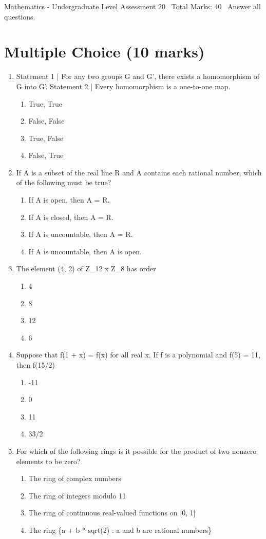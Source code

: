 \documentclass[12pt]{article}
\begin{document}
\begin{center}
Mathematics - Undergraduate Level Assessment 20 \
Total Marks: 40 \
Answer all questions.
\end{center}

\section*{Multiple Choice (10 marks)}
\begin{enumerate}[label=\arabic*.]
\item Statement 1 | For any two groups G and G', there exists a homomorphism of G into G'. Statement 2 | Every homomorphism is a one-to-one map.
\begin{enumerate}[label=(\alph*)]
    \item True, True
    \item False, False
    \item True, False
    \item False, True
\end{enumerate}
\item If A is a subset of the real line R and A contains each rational number, which of the following must be true?
\begin{enumerate}[label=(\alph*)]
    \item If A is open, then A = R.
    \item If A is closed, then A = R.
    \item If A is uncountable, then A = R.
    \item If A is uncountable, then A is open.
\end{enumerate}
\item The element (4, 2) of Z\_12 x Z\_8 has order
\begin{enumerate}[label=(\alph*)]
    \item 4
    \item 8
    \item 12
    \item 6
\end{enumerate}
\item Suppose that f(1 + x) = f(x) for all real x. If f is a polynomial and f(5) = 11, then f(15/2)
\begin{enumerate}[label=(\alph*)]
    \item -11
    \item 0
    \item 11
    \item 33/2
\end{enumerate}
\item For which of the following rings is it possible for the product of two nonzero elements to be zero?
\begin{enumerate}[label=(\alph*)]
    \item The ring of complex numbers
    \item The ring of integers modulo 11
    \item The ring of continuous real-valued functions on [0, 1]
    \item The ring \{a + b * sqrt(2) : a and b are rational numbers\}
\end{enumerate}
\end{enumerate}
\end{document}
